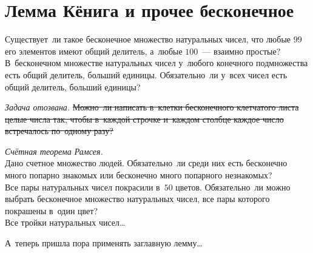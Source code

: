
\section*{Лемма Кёнига и прочее бесконечное}



\begin{problems}

\item
\subproblem
Существует~ли такое бесконечное множество натуральных чисел, что любые $99$ его
элементов имеют общий делитель, а~любые $100$~--- взаимно простые?
\\
\subproblem
В~бесконечном множестве натуральных чисел у~любого конечного подмножества есть
общий делитель, больший единицы.
Обязательно~ли у~всех чисел есть общий делитель, больший единицы?

\item\emph{Задача отозвана.}
\sout{%
Можно~ли написать в~клетки бесконечного клетчатого листа целые числа так, чтобы
в~каждой строчке и~каждом столбце каждое число встречалось по~одному разу?}

\item \emph{Счётная теорема Рамсея.}
\\
\subproblem
Дано счетное множество людей.
Обязательно~ли среди них есть бесконечно много попарно знакомых или бесконечно
много попарного незнакомых?
\\
\subproblem
Все пары натуральных чисел покрасили в~$50$ цветов.
Обязательно~ли можно выбрать бесконечное множество натуральных чисел, все пары
которого покрашены в~один цвет?
\\
\subproblem
Все тройки натуральных чисел\ldots

\end{problems}

А~теперь пришла пора применять заглавную лемму\ldots

